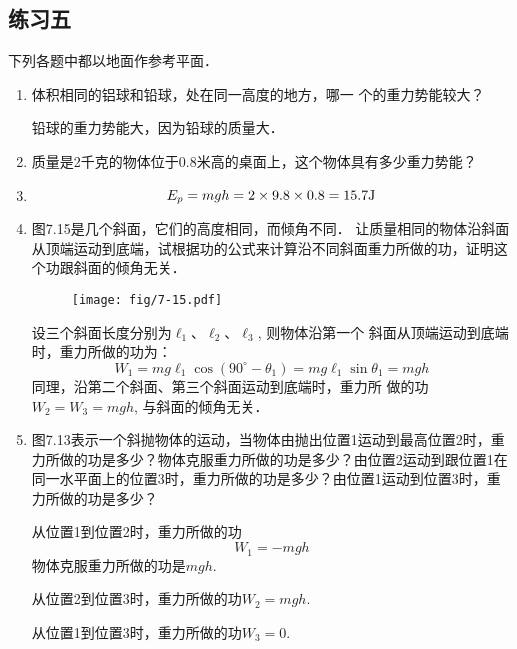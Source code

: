 \subsection{练习五}
下列各题中都以地面作参考平面．
\begin{enumerate}
    \item 体积相同的铝球和铅球，处在同一高度的地方，哪一
    个的重力势能较大？

    \begin{solution}
        铅球的重力势能大，因为铅球的质量大．
    \end{solution}
    \item 质量是2千克的物体位于0.8米高的桌面上，这个物体具有多少重力势能？
    \item 
    \begin{solution}
    \[E_p=mgh=2\times 9.8\times 0.8=15.7{\rm J}\]
    \end{solution}
    \item 图7.15是几个斜面，它们的高度相同，而倾角不同．
    让质量相同的物体沿斜面从顶端运动到底端，试根据功的公式来计算沿不同斜面重力所做的功，证明这个功跟斜面的倾角无关．
\begin{figure}[htp]
\centering \texttt{[image: fig/7-15.pdf]}
\caption{}
\end{figure}

\begin{solution}
    设三个斜面长度分别为$\ell_1$、$\ell_2$、$\ell_3$, 则物体沿第一个
    斜面从顶端运动到底端时，重力所做的功为：
  \[  W_1=mg\ell_1 \cos(90^{\circ}-\theta_1)=mg\ell_1\sin\theta_1=mgh\]
    同理，沿第二个斜面、第三个斜面运动到底端时，重力所
    做的功$W_2=W_3=mgh$, 与斜面的倾角无关．
\end{solution}
\item 图7.13表示一个斜抛物体的运动，当物体由抛出位置1运动到最高位置2时，重力所做的功是多少？物体克服重力所做的功是多少？由位置2运动到跟位置1在同一水平面上的位置3时，重力所做的功是多少？由位置1运动到位置3时，重力所做的功是多少？
\begin{figure}[htp]\centering
{}
\caption{}
\end{figure}

\begin{solution}
    从位置1到位置2时，重力所做的功
\[    W_1=-mgh\]
    物体克服重力所做的功是$mgh$.

    从位置2到位置3时，重力所做的功$W_2=mgh$.

    从位置1到位置3时，重力所做的功$W_3=0$.
\end{solution}
\end{enumerate}


